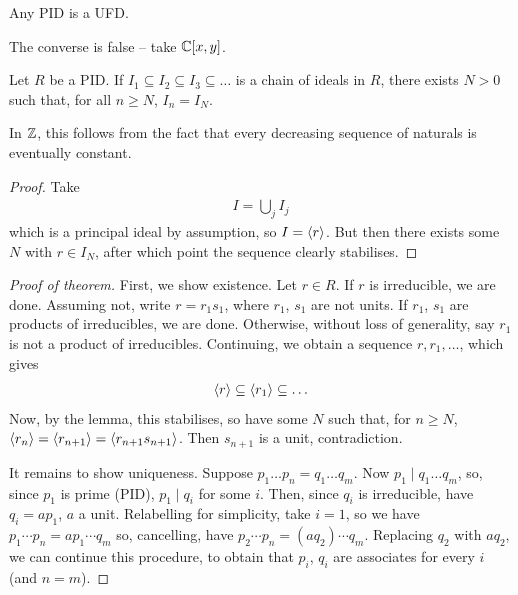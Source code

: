 \documentclass{../template/note}
\begin{document}

    \begin{theorem}
        Any PID is a UFD.
    \end{theorem}

    \begin{remark*}
        The converse is false -- take $\mathbb C[x, y]$.
    \end{remark*}
    
    \begin{lemma}
        Let $R$ be a PID. If $I_1 \subseteq I_2 \subseteq I_3 \subseteq \dots$ is a chain of ideals in $R$, there exists $N > 0$ such that, for all $n \geq N$, $I_n = I_N$.
    \end{lemma}
    
    \begin{remark*}
        In $\mathbb Z$, this follows from the fact that every decreasing sequence of naturals is eventually constant.
    \end{remark*}

    \begin{proof}
        Take
        \begin{align*}
            I = \bigcup_j I_j
        \end{align*}
        which is a principal ideal by assumption, so $I = \left \langle r \right \rangle$. But then there exists some $N$ with $r \in I_N$, after which point the sequence clearly stabilises.
    \end{proof}
    
    \begin{proof}[Proof of theorem]
        First, we show existence. Let $r \in R$. If $r$ is irreducible, we are done. Assuming not, write $r = r_1s_1$, where $r_1$, $s_1$ are not units. If $r_1$, $s_1$ are products of irreducibles, we are done. Otherwise, without loss of generality, say $r_1$ is not a product of irreducibles. Continuing, we obtain a sequence $r, r_1, \dots$, which gives
        \begin{align*}
            \left \langle r \right \rangle \subseteq \left \langle r_1 \right \rangle \subseteq \dots 
        \end{align*}
        Now, by the lemma, this stabilises, so have some $N$ such that, for $n \geq N$, $\left \langle r_n \right \rangle = \left \langle r_{n+1} \right \rangle = \left \langle r_{n+1}s_{n+1} \right \rangle$. Then $s_{n+1}$ is a unit, contradiction.

        It remains to show uniqueness. Suppose $p_1 \dots p_n = q_1 \dots q_m$. Now $p_1 \mid q_1 \dots q_m$, so, since $p_1$ is prime (PID), $p_1 \mid q_i$ for some $i$. Then, since $q_i$ is irreducible, have $q_i = ap_1$, $a$ a unit. Relabelling for simplicity, take $i=1$, so we have $p_1 \cdots p_n = ap_1 \cdots q_m$ so, cancelling, have $p_2 \cdots p_n = (aq_2) \cdots q_m$. Replacing $q_2$ with $aq_2$, we can continue this procedure, to obtain that $p_i$, $q_i$ are associates for every $i$ (and $n=m$).
    \end{proof}
    
\end{document}
